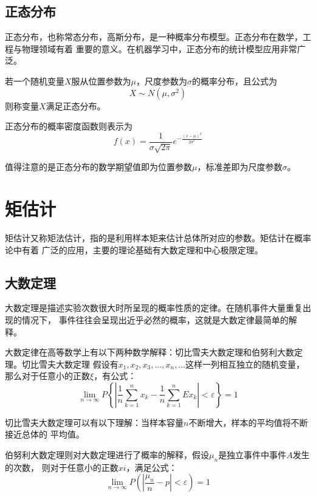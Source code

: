 \subsection{正态分布}
正态分布，也称常态分布，高斯分布，是一种概率分布模型。正态分布在数学，工程与物理领域有着
重要的意义。在机器学习中，正态分布的统计模型应用非常广泛。

若一个随机变量$X$服从位置参数为$\mu$，尺度参数为$\sigma$的概率分布，且公式为
\begin{equation*}
  X \sim N\left(\mu, \sigma^{2}\right)
\end{equation*}
\noindent
则称变量$X$满足正态分布。

正态分布的概率密度函数则表示为
\begin{equation*}
  f(x)=\frac{1}{\sigma \sqrt{2 \pi}} e^{-\frac{(x-\mu)^{2}}{2 \sigma^{2}}}
\end{equation*}

\noindent
值得注意的是正态分布的数学期望值即为位置参数$\mu$，标准差即为尺度参数$\sigma$。



\section{矩估计}

矩估计又称矩法估计，指的是利用样本矩来估计总体所对应的参数。矩估计在概率论中有着
广泛的应用，主要的理论基础有大数定理和中心极限定理。

\subsection{大数定理}

大数定理是描述实验次数很大时所呈现的概率性质的定律。在随机事件大量重复出现的情况下，
事件往往会呈现出近乎必然的概率，这就是大数定律最简单的解释。


大数定律在高等数学上有以下两种数学解释：切比雪夫大数定理和伯努利大数定理。切比雪夫大数定理
假设有$x_1,x_2,x_3,...,x_n,...$这样一列相互独立的随机变量，那么对于任意小的正数$\xi$，有公式：
\begin{equation*}
  \lim _{n \rightarrow \infty} P\left\{\left|\frac{1}{n} \sum_{k=1}^{n} x_{k}-\frac{1}{n} \sum_{k=1}^{n} E x_{k}\right|<\varepsilon\right\}=1
\end{equation*}

\noindent
切比雪夫大数定理可以有以下理解：当样本容量$n$不断增大，样本的平均值将不断接近总体的
平均值。


伯努利大数定理则对大数定理进行了概率的解释，假设$\mu_n$是独立事件中事件$A$发生的次数，
则对于任意小的正数$xi$，满足公式：
\begin{equation*}
  \lim _{n \rightarrow \infty} P\left(\left|\frac{\mu_{n}}{n}-p\right|<\varepsilon\right)=1
\end{equation*}

